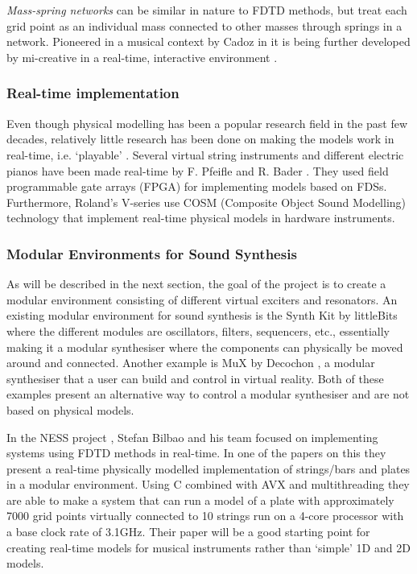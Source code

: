 \\
\\
\textit{Mass-spring networks} can be similar in nature to FDTD methods, but treat each grid point as an individual mass connected to other masses through springs in a network. Pioneered in a musical context by Cadoz in \cite{Cadoz1979, Cadoz1983, Cadoz1993} it is being further developed by mi-creative in a real-time, interactive environment \cite{Villeneuve2019, Leonard2019}. 

\subsubsection*{Real-time implementation}
Even though physical modelling has been a popular research field in the past few decades, relatively little research has been done on making the models work in real-time, i.e. `playable’ \cite{Mehes2016}. Several virtual string instruments and different electric pianos have been made real-time by F. Pfeifle and R. Bader \cite{Pfeifle2012, Pfeifle2015, Pfeifle2017}. They used field programmable gate arrays (FPGA) for implementing models based on FDSs. Furthermore, Roland’s V-series use COSM (Composite Object Sound Modelling) technology \cite{Bybee2019} that implement real-time physical models in hardware instruments.

\subsubsection*{Modular Environments for Sound Synthesis}

As will be described in the next section, the goal of the project is to create a modular environment consisting of different virtual exciters and resonators. An existing modular environment for sound synthesis is the Synth Kit by littleBits \cite{littleBits2019} where the different modules are oscillators, filters, sequencers, etc., essentially making it a modular synthesiser where the components can physically be moved around and connected. Another example is MuX by Decochon \cite{MuX2019}, a modular synthesiser that a user can build and control in virtual reality. Both of these examples present an alternative way to control a modular synthesiser and are not based on physical models.

In the NESS project \cite{NESS2016}, Stefan Bilbao and his team focused on implementing systems using FDTD methods in real-time. In one of the papers on this \cite{Webb2015} they present a real-time physically modelled implementation of strings/bars and plates in a modular environment. Using C combined with AVX and multithreading they are able to make a system that can run a model of a plate with approximately 7000 grid points virtually connected to 10 strings run on a 4-core processor with a base clock rate of 3.1GHz. Their paper will be a good starting point for creating real-time models for musical instruments rather than ‘simple’ 1D and 2D models.


